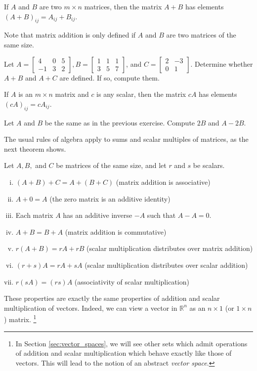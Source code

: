 \documentclass[12pt,letterpaper,reqno]{article}
\numberwithin{equation}{section}
\newcommand{\R}{\ensuremath{\mathbb R}}
\begin{document}
\begin{defn}
	If $A$ and $B$ are two $m \times n$ matrices, then the matrix $A+B$ has elements $(A+B)_{ij}=A_{ij}+B_{ij}$.
\end{defn}
Note that matrix addition is only defined if $A$ and $B$ are two matrices of the same size.
\begin{exercise}
	Let $A=\begin{bmatrix}
	4&0&5 \\ -1&3&2
\end{bmatrix}, B=\begin{bmatrix}
	1&1&1\\3&5&7
\end{bmatrix}$, and $C=\begin{bmatrix}
	2&-3 \\ 0&1
\end{bmatrix}$. Determine whether $A+B$ and $A+C$ are defined. If so, compute them.
\end{exercise}


\begin{defn}
	If $A$ is an $m \times n$ matrix and $c$ is any scalar, then the matrix $cA$ has elements $(cA)_{ij}=cA_{ij}$.
\end{defn}

\begin{exercise}
Let $A$ and $B$ be the same as in the previous exercise. Compute $2B$ and $A-2B$.	
\end{exercise}

The usual rules of algebra apply to sums and scalar multiples of matrices, as the next theorem shows.

\begin{thm}\label{thm:matrix_add_scalar_multiply_properties}
Let $A,B,$ and $C$ be matrices of the same size, and let $r$ and $s$ be scalars.
	\begin{enumerate}[(i)]
		\item $(A+B)+C=A+(B+C)$ (matrix addition is associative)
		\item $A+0=A$ (the zero matrix is an additive identity)
		\item Each matrix $A$ has an additive inverse $-A$ such that $A-A=0$.
		\item $A+B=B+A$ (matrix addition is commutative) 
		\item $r(A+B)=rA+rB$ (scalar multiplication distributes over matrix addition)
		\item $(r+s)A=rA+sA$ (scalar multiplication distributes over scalar addition)
		\item $r(sA)=(rs)A$ (associativity of scalar multiplication)
	\end{enumerate}
	These properties are exactly the same properties of addition and scalar multiplication of vectors. Indeed, we can view a vector in $\R^n$ as an $n \times 1$ (or $1 \times n$) matrix. \footnote{In Section \ref{sec:vector_spaces}, we will see other sets which admit operations of addition and scalar multiplication which behave exactly like those of vectors. This will lead to the notion of an abstract \emph{vector space}.}
\end{thm}
\end{document}

